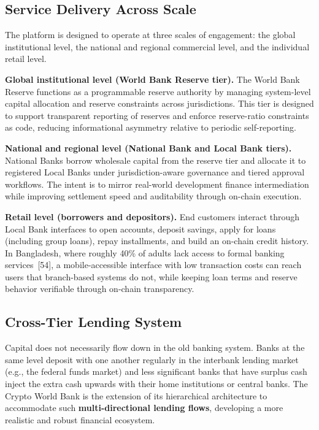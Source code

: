 \documentclass[12pt,a4paper]{report}
\begin{document}
\subsection{Service Delivery Across Scale}

The platform is designed to operate at three scales of engagement: the global institutional level, the national and regional commercial level, and the individual retail level.

\textbf{Global institutional level (World Bank Reserve tier).} The World Bank Reserve functions as a programmable reserve authority by managing system-level capital allocation and reserve constraints across jurisdictions. This tier is designed to support transparent reporting of reserves and enforce reserve-ratio constraints as code, reducing informational asymmetry relative to periodic self-reporting.

\textbf{National and regional level (National Bank and Local Bank tiers).} National Banks borrow wholesale capital from the reserve tier and allocate it to registered Local Banks under jurisdiction-aware governance and tiered approval workflows. The intent is to mirror real-world development finance intermediation while improving settlement speed and auditability through on-chain execution.

\textbf{Retail level (borrowers and depositors).} End customers interact through Local Bank interfaces to open accounts, deposit savings, apply for loans (including group loans), repay installments, and build an on-chain credit history. In Bangladesh, where roughly 40\% of adults lack access to formal banking services~[54], a mobile-accessible interface with low transaction costs can reach users that branch-based systems do not, while keeping loan terms and reserve behavior verifiable through on-chain transparency.

\subsection{Cross-Tier Lending System}

Capital does not necessarily flow down in the old banking system. Banks at the same level deposit with one another regularly in the interbank lending market (e.g., the federal funds market) and less significant banks that have surplus cash inject the extra cash upwards with their home institutions or central banks. The Crypto World Bank is the extension of its hierarchical architecture to accommodate such \textbf{multi-directional lending flows}, developing a more realistic and robust financial ecosystem.
\end{document}

